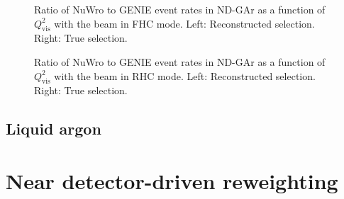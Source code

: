 \begin{figure}[h]
	\begin{minipage}[t]{.5\linewidth}
		\begin{adjustbox}{max totalsize=\linewidth, center}
			
		\end{adjustbox}
	\end{minipage}
 	\hfill
 	\begin{minipage}[t]{.5\linewidth}
 		\begin{adjustbox}{max totalsize=\linewidth, center}
 			
 		\end{adjustbox}
 	\end{minipage}
 	\caption[Comparison of NuWro and GENIE in $Q^{2}_{\textrm{vis}}$ for FHC]{Ratio of NuWro to GENIE event rates in ND-GAr as a function of $Q^{2}_{\textrm{vis}}$ with the beam in FHC mode. Left: Reconstructed selection. Right: True selection.}
 	\label{fig:Q2CompFhc}
\end{figure}

\begin{figure}[h]
	\begin{minipage}[t]{.5\linewidth}
		\begin{adjustbox}{max totalsize=\linewidth, center}
			
		\end{adjustbox}
	\end{minipage}
	\hfill
	\begin{minipage}[t]{.5\linewidth}
		\begin{adjustbox}{max totalsize=\linewidth, center}
			
		\end{adjustbox}
	\end{minipage}
	\caption[Comparison of NuWro and GENIE in $Q^{2}_{\textrm{vis}}$ for RHC]{Ratio of NuWro to GENIE event rates in ND-GAr as a function of $Q^{2}_{\textrm{vis}}$ with the beam in RHC mode. Left: Reconstructed selection. Right: True selection.}
	\label{fig:Q2CompRhc}
\end{figure}

\subsection{Liquid argon}

\section{Near detector-driven reweighting}

